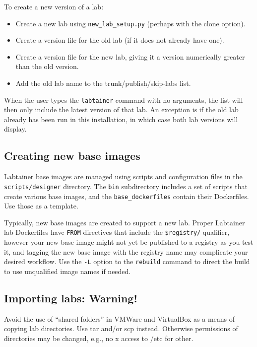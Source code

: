 \documentclass[12pt]{article}
\begin{document}
To create a new version of a lab:
\begin{itemize}
\item Create a new lab using {\tt new\_lab\_setup.py} (perhaps with the clone option).
\item Create a version file for the old lab (if it does not already have one). 
\item Create a version file for the new lab, giving it a version numerically greater than
the old version.
\item Add the old lab name to the trunk/publish/skip-labs list.
\end{itemize}

When the user types the {\tt labtainer} command with no arguments, the list will then
only include the latest version of that lab.  An exception is if the old lab already
has been run in this installation, in which case both lab versions will display.

\subsection{Creating new base images}
Labtainer base images are managed using scripts and configuration files in the {\tt scripts/designer} directory.
The {\tt bin} subdirectory includes a set of scripts that create various base images, and the
{\tt base\_dockerfiles} contain their Dockerfiles.  Use those as a template.

Typically, new base images are created to support a new lab.  Proper Labtainer lab Dockerfiles have {\tt FROM} directives
that include the {\tt \$registry/} qualifier, however your new base image might not yet be published to a registry
as you test it, and tagging the new base image with the registry name may complicate your desired workflow.  
Use the {\tt -L} option to the {\tt rebuild} command to direct the build to use unqualified image names if needed.

\subsection{Importing labs: Warning!}
\label{warnings}
Avoid the use of ``shared folders'' in VMWare and VirtualBox as a means of copying lab
directories.  Use tar and/or scp instead.  Otherwise permissions of directories may
be changed, e.g., no x access to /etc for other.
\end{document}

